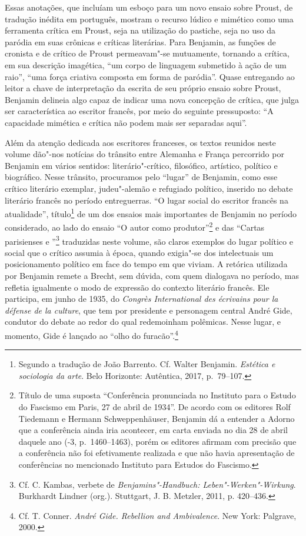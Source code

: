 Essas anotações, que incluíam um esboço para um novo ensaio sobre Proust, de tradução inédita em português, mostram o recurso lúdico e mimético como uma ferramenta crítica em Proust, seja na utilização do pastiche, seja no uso da paródia em suas crônicas e críticas literárias. Para Benjamin, as funções de cronista e de crítico de Proust permeavam"-se mutuamente, tornando a crítica, em sua descrição imagética, ``um corpo de linguagem submetido à ação de um raio'', ``uma força criativa composta em forma de paródia''. Quase entregando ao leitor a chave de interpretação da escrita de seu próprio ensaio sobre Proust, Benjamin delineia algo capaz de indicar uma nova concepção de crítica, que julga ser característica ao escritor francês, por meio do seguinte pressuposto: ``A capacidade mimética e crítica não podem mais ser separadas aqui''.

Além da atenção dedicada aos escritores franceses, os textos reunidos neste volume dão"-nos notícias do trânsito
entre Alemanha e França percorrido por Benjamin em vários sentidos:
literário"-crítico, filosófico, artístico, político e biográfico. Nesse trânsito, procuramos pelo ``lugar'' de Benjamin, como esse crítico literário exemplar,
judeu"-alemão e refugiado político, inserido no debate literário francês no período
entreguerras. ``O lugar social do escritor francês na atualidade'',
título\footnote{Segundo a tradução de João Barrento. Cf. Walter Benjamin. \textit{Estética e sociologia da arte}. Belo Horizonte: Autêntica,
  2017, p.~79--107.} de um dos ensaios mais importantes de Benjamin no
período considerado, ao lado do ensaio ``O autor como
produtor''\footnote{Título de uma suposta ``Conferência pronunciada no
  Instituto para o Estudo do Fascismo em Paris, 27 de abril de 1934''.
  De acordo com os editores Rolf Tiedemann e Hermann Schweppenhäuser,
  Benjamin dá a entender a Adorno que a conferência ainda iria
  acontecer, em carta enviada no dia 28 de abril daquele ano (-3, p.~1460--1463), porém os editores afirmam com
  precisão que a conferência não foi efetivamente realizada e que não
  havia apresentação de conferências no mencionado Instituto para
  Estudos do Fascismo.} e das ``Cartas parisienses  e ''\footnote{Cf.
  C. Kambas, verbete de \emph{Benjamins"-Handbuch: Leben"-Werken"-Wirkung}. Burkhardt Lindner (org.). Stuttgart, J. B. Metzler, 2011, p. 420--436.}
traduzidas neste volume, são claros exemplos do lugar político e social
que o crítico assumia à época, quando exigia"-se dos intelectuais um
posicionamento político em face do tempo em que viviam. A retórica utilizada por
Benjamin remete a Brecht, sem dúvida, com quem dialogava no período, mas
refletia igualmente o modo de expressão do contexto literário francês.
Ele participa, em junho de 1935, do \emph{Congrès International des
écrivains pour la défense de la culture}, que tem por presidente e
personagem central André Gide, condutor do debate ao redor do qual
redemoinham polêmicas. Nesse lugar, e momento, Gide é lançado ao ``olho do
furacão''.\footnote{Cf. T. Conner. \emph{André Gide. Rebellion and
  Ambivalence}. New York: Palgrave, 2000.}

